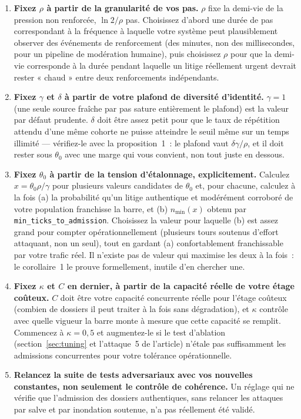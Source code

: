 \documentclass[11pt]{article}
\begin{document}
\begin{enumerate}
\item \textbf{Fixez $\rho$ à partir de la granularité de vos pas.} $\rho$
  fixe la demi-vie de la pression non renforcée, $\ln 2/\rho$ pas.
  Choisissez d'abord une durée de pas correspondant à la fréquence à
  laquelle votre système peut plausiblement observer des événements de
  renforcement (des minutes, non des millisecondes, pour un pipeline de
  modération humaine), puis choisissez $\rho$ pour que la demi-vie
  corresponde à la durée pendant laquelle un litige réellement urgent
  devrait rester « chaud » entre deux renforcements indépendants.
\item \textbf{Fixez $\gamma$ et $\delta$ à partir de votre plafond de
  diversité d'identité.} $\gamma=1$ (une seule source fraîche par pas
  sature entièrement le plafond) est la valeur par défaut prudente.
  $\delta$ doit être assez petit pour que le taux de répétition attendu
  d'une même cohorte ne puisse atteindre le seuil même sur un temps
  illimité --- vérifiez-le avec la proposition~1~: le plafond vaut
  $\delta\gamma/\rho$, et il doit rester sous $\theta_0$ avec une marge
  qui vous convient, non tout juste en dessous.
\item \textbf{Fixez $\theta_0$ à partir de la tension d'étalonnage,
  explicitement.} Calculez $x = \theta_0\rho/\gamma$ pour plusieurs
  valeurs candidates de $\theta_0$ et, pour chacune, calculez à la fois
  (a) la probabilité qu'un litige authentique et modérément corroboré de
  votre population franchisse la barre, et (b) $n_{\min}(x)$ obtenu par
  \texttt{min\_ticks\_to\_admission}. Choisissez la valeur pour laquelle
  (b) est assez grand pour compter opérationnellement (plusieurs tours
  soutenus d'effort attaquant, non un seul), tout en gardant (a)
  confortablement franchissable par votre trafic réel. Il n'existe pas
  de valeur qui maximise les deux à la fois~: le corollaire~1 le prouve
  formellement, inutile d'en chercher une.
\item \textbf{Fixez $\kappa$ et $C$ en dernier, à partir de la capacité
  réelle de votre étage coûteux.} $C$ doit être votre capacité
  concurrente réelle pour l'étage coûteux (combien de dossiers il peut
  traiter à la fois sans dégradation), et $\kappa$ contrôle avec quelle
  vigueur la barre monte à mesure que cette capacité se remplit.
  Commencez à $\kappa=0{,}5$ et augmentez-le si le test d'ablation
  (section~\ref{sec:tuning} et l'attaque~5 de l'article) n'étale pas
  suffisamment les admissions concurrentes pour votre tolérance
  opérationnelle.
\item \textbf{Relancez la suite de tests adversariaux avec vos nouvelles
  constantes, non seulement le contrôle de cohérence.} Un réglage qui ne
  vérifie que l'admission des dossiers authentiques, sans relancer les
  attaques par salve et par inondation soutenue, n'a pas réellement été
  validé.
\end{enumerate}
\end{document}
